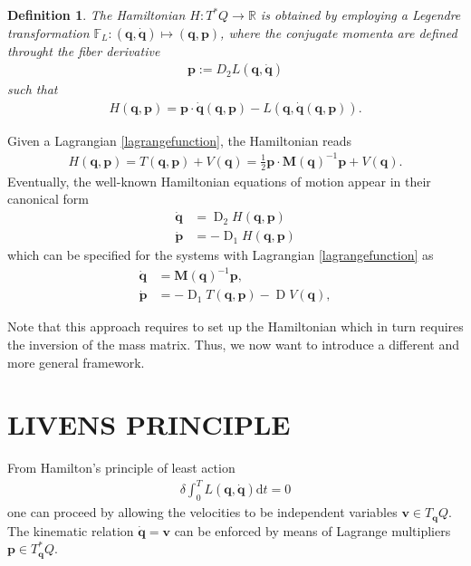 \documentclass{multibody2023_full_paper}
\newtheorem{definition}[theorem]{Definition}
\newcommand{\dt}{\mathrm{d}t}
\DeclareMathOperator{\D}{D}
\newcommand{\inv}{^{-1}}
\renewcommand{\vec}[1]{\ensuremath{\mbox{$\mathbf{#1}$}}}
\begin{document}
\begin{definition}
    The Hamiltonian $H: T^*Q \rightarrow \mathbb{R} $ is obtained by employing a Legendre transformation $\mathbb{F}_L: (\vec{q},\dot{\vec{q}}) \mapsto (\vec{q},\vec{p})$, where the conjugate momenta are defined throught the fiber derivative
    \begin{align}
        \vec{p}:=D_2 L(\vec{q}, \dot{\vec{q}})
    \end{align}
    such that
    \begin{align}
        H(\vec{q},\vec{p}) =  \vec{p} \cdot \dot{\vec{q}}(\vec{q},\vec{p}) - L(\vec{q},\dot{\vec{q}}(\vec{q},\vec{p})) . \label{legendre}
    \end{align}
\end{definition}
Given a Lagrangian \eqref{lagrangefunction}, the Hamiltonian reads
\begin{align}
    H(\vec{q},\vec{p}) = T(\vec{q},\vec{p}) + V(\vec{q}) = \frac{1}{2} \vec{p} \cdot \vec{M}(\vec{q})^{-1} \vec{p} + V(\vec{q}) .\label{hamiltonian}
\end{align}
Eventually, the well-known Hamiltonian equations of motion appear in their canonical form
\begin{subequations}
    \label{canonical_Ham_EL}
    \begin{align}
        \dot{\vec{q}} & = \D_2 H(\vec{q},\vec{p})   \\
        \dot{\vec{p}} & = - \D_1 H(\vec{q},\vec{p})
    \end{align}
\end{subequations}
which can be specified for the systems with Lagrangian \eqref{lagrangefunction} as
\begin{subequations}
    \label{canonical_Ham_EL_2}
    \begin{align}
        \dot{\vec{q}} & = \vec{M}(\vec{q})\inv \vec{p},  \label{canonical_Ham_EL_2-1}             \\
        \dot{\vec{p}} & = - \D_1 T(\vec{q},\vec{p}) - \D V(\vec{q}), \label{canonical_Ham_EL_2-2}
    \end{align}
\end{subequations}

Note that this approach requires to set up the Hamiltonian which in turn requires the inversion of the mass matrix. Thus, we now want to introduce a different and more general framework.

\section{LIVENS PRINCIPLE}\label{sec_livens}
From Hamilton's principle of least action
\begin{align}
    \delta \int_0^T L(\vec{q},\dot{\vec{q}}) \dt = 0
\end{align}
one can proceed by allowing the velocities to be independent variables $\vec{v} \in T_\mathbf{q} Q$. The kinematic relation $\dot{\vec{q}} = \vec{v}$ can be enforced by means of Lagrange multipliers $\vec{p}  \in T^*_\mathbf{q} Q$.
\end{document}
